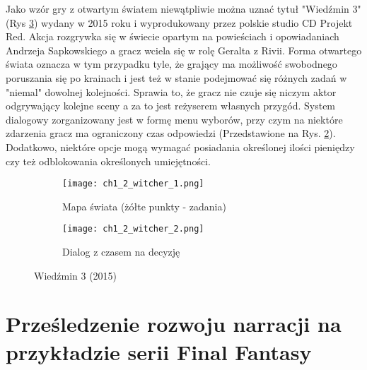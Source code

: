 \newpage

Jako wzór gry z otwartym światem niewątpliwie można uznać tytuł "Wiedźmin 3" (Rys \ref{fig:ch1_2_witcher})
wydany w 2015 roku i wyprodukowany przez polskie studio CD Projekt Red. Akcja rozgrywka się w świecie
opartym na powieściach i opowiadaniach Andrzeja Sapkowskiego a gracz wciela się w rolę Geralta z Rivii.
Forma otwartego świata oznacza w tym przypadku tyle, że grający ma możliwość swobodnego poruszania się
po krainach i jest też w stanie podejmować się różnych zadań w "niemal" dowolnej kolejności. Sprawia to, że
gracz nie czuje się niczym aktor odgrywający kolejne sceny a za to jest reżyserem własnych przygód.
System dialogowy zorganizowany jest w formę menu wyborów, przy czym na niektóre zdarzenia gracz ma
ograniczony czas odpowiedzi (Przedstawione na Rys. \ref{subfig:ch_1_2_witcher_2}). Dodatkowo, niektóre
opcje mogą wymagać posiadania określonej ilości pieniędzy czy też odblokowania określonych umiejętności.

\begin{figure}[h]
    \begin{subfigure}{0.49\textwidth}
        \caption{Mapa świata (żółte punkty - zadania)}
        \texttt{[image: ch1\_2\_witcher\_1.png]}
        \label{subfig:ch_1_2_witcher_1}
    \end{subfigure}
    \begin{subfigure}{0.49\textwidth}
        \caption{Dialog z czasem na decyzję}
        \texttt{[image: ch1\_2\_witcher\_2.png]}
        \label{subfig:ch_1_2_witcher_2}
    \end{subfigure}
    \caption{Wiedźmin 3 (2015)}
    \label{fig:ch1_2_witcher}
\end{figure}

\newpage

\section{Prześledzenie rozwoju narracji na przykładzie serii Final Fantasy}\label{subsection:ch1_3}



